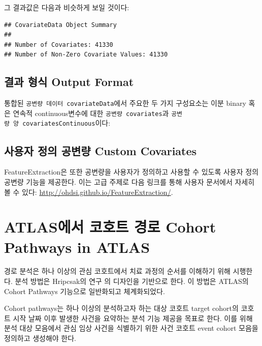 \documentclass[10.5pt]{book}
\newenvironment{Shaded}{\begin{snugshade}}{\end{snugshade}}
\newcommand{\OperatorTok}[1]{\textcolor[rgb]{0.81,0.36,0.00}{\textbf{#1}}}
\newcommand{\NormalTok}[1]{#1}
\theoremstyle{definition}
\theoremstyle{definition}
\theoremstyle{definition}
\theoremstyle{remark}
\begin{document}
그 결과값은 다음과 비슷하게 보일 것이다:

\begin{verbatim}
## CovariateData Object Summary
##
## Number of Covariates: 41330
## Number of Non-Zero Covariate Values: 41330
\end{verbatim}

\subsection{결과 형식 Output Format}\label{--output-format}

통합된 \texttt{공변량\ 데이터\ covariateData}에서 주요한 두 가지
구성요소는 이분 binary 혹은 연속적 continuous변수에 대한
\texttt{공변량\ covariates}과
\texttt{공변량\ 양\ covariatesContinuous}이다:

\begin{Shaded}
\end{Shaded}

\subsection{사용자 정의 공변량 Custom
Covariates}\label{---custom-covariates}

FeatureExtraction은 또한 공변량을 사용자가 정의하고 사용할 수 있도록
사용자 정의 공변량 기능을 제공한다. 이는 고급 주제로 다음 링크를 통해
사용자 문서에서 자세히 볼 수 있다:
\url{http://ohdsi.github.io/FeatureExtraction/}.

\section{ATLAS에서 코호트 경로 Cohort Pathways in
ATLAS}\label{atlas---cohort-pathways-in-atlas}

경로 분석은 하나 이상의 관심 코호트에서 치료 과정의 순서를 이해하기 위해
시행한다. 분석 방법은 Hripcsak의 연구 \citep{Hripcsak7329} 의 디자인을
기반으로 한다. 이 방법은 ATLAS의 Cohort Pathways 기능으로 일반화되고
체계화되었다.

Cohort pathways는 하나 이상의 분석하고자 하는 대상 코호트 target
cohort의 코호트 시작 날짜 이후 발생한 사건을 요약하는 분석 기능 제공을
목표로 한다. 이를 위해 분석 대상 모음에서 관심 임상 사건을 식별하기 위한
사건 코호트 event cohort 모음을 정의하고 생성해야 한다.
\end{document}
